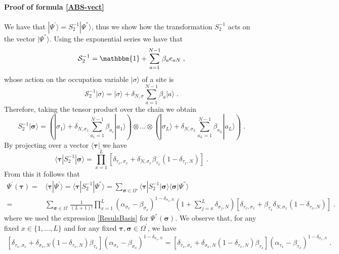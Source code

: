 \documentclass[10pt]{article}
\numberwithin{equation}{section}
\numberwithin{equation}{subsection}
\newcommand{\co}{\;,}
\newcommand{\dt}{\;.}
\newcommand{\fra}[1]{\textcolor[rgb]{0,0,1}{#1}}
\begin{document}
\paragraph{Proof of formula \eqref{ABS-vect}} We have that $|\Psi^{'}\rangle=S_{2}^{-1}|\Psi^{''}\rangle$, thus we  show how the transformation $S_{2}^{-1}$ acts on the vector $|\Psi^{''}\rangle$. Using the exponential series we have that  
\begin{equation}
   \mathcal{S}_{2}^{-1}=\mathbbm{1}+\sum_{a=1}^{N-1}\beta_{a}e_{aN}\co
\end{equation}
\fra{whose action} on the occupation variable $|\sigma\rangle$ of a site is 
\begin{equation}
  \mathcal{S}_{2}^{-1} |\sigma\rangle= |\sigma\rangle+\delta_{N,\sigma}\sum_{a=1}^{N-1}\beta_a|a\rangle\dt
\end{equation} 
Therefore, taking the tensor product over the chain we obtain 
\begin{equation}
 S_{2}^{-1} |\bm{\sigma}\rangle=\left( |\sigma_1\rangle+\delta_{N,\sigma_1}\sum_{a_1=1}^{N-1}\beta_{a_1}|a_1\rangle\right)\otimes\ldots\otimes \left( |\sigma_L\rangle+\delta_{N,\sigma_L}\sum_{a_L=1}^{N-1}\beta_{a_L}|a_L\rangle\right)\dt
\end{equation} 
By projecting over a vector $\langle \bm{\tau}|$ we have 
\begin{equation}\label{goodTP-S2}
  \langle \bm{\tau}|S_{2}^{-1} |\bm{\sigma}\rangle=\prod_{x=1}^L\left[ \delta_{\tau_x,\sigma_x}+\delta_{N,\sigma_x}\beta_{\tau_x} (1-\delta_{\tau_x,N})\right]\dt
\end{equation} 
From this it follows that
\begin{align}\label{ABS_intermediate}
		\Psi^{'}(\bm{\tau})=&\langle\bm{\tau}|\Psi^{'}\rangle=\langle \bm{\tau}|S_{2}^{-1}|\Psi^{''}\rangle = \sum_{\bm{\sigma}\in \Omega'}  \langle \bm{\tau}|S_{2}^{-1} |\bm{\sigma}\rangle\langle\bm{\sigma}|\Psi^{''}\rangle \nonumber\\=&\sum_{\bm{\sigma}\in \Omega^{'}}\frac{1}{(L+1)!}\prod_{x=1}^L(\alpha_{\sigma_{x}}-\beta_{\sigma_{x}})^{1-\delta_{\sigma_{x},N}}\left(1+\sum_{j=x}^{L}\delta_{\sigma_{j},N}\right)\left[ \delta_{\tau_x,\sigma_x}+\beta_{\tau_x} \delta_{N,\sigma_x} (1-\delta_{\tau_x,N})\right]\dt
	\end{align}
	where we used the expression \eqref{ResulsBasis} for $\Psi^{''}(\bm{\sigma})$.
We observe that, for any fixed $x\in \{1,\ldots,L\}$ and for any fixed $\bm{\tau},\bm{\sigma}\in\Omega^{'}$, we have 
\begin{align}
	\left[\delta_{\tau_{x},\sigma_{x}}+\delta_{\sigma_{x},N}(1-\delta_{\tau_{x},N})\beta_{\tau_{x}}\right]\left(\alpha_{\sigma_{x}}-\beta_{\sigma_{x}}\right)^{1-\delta_{\sigma_{x},N}}=	\left[\delta_{\tau_{x},\sigma_{x}}+\delta_{\sigma_{x},N}(1-\delta_{\tau_{x},N})\beta_{\tau_{x}}\right]\left(\alpha_{\tau_{x}}-\beta_{\tau_{x}}\right)^{1-\delta_{\sigma_{x},N}}\dt
\end{align}
\end{document}
